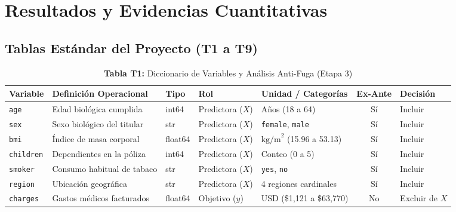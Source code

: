 \documentclass[11pt,a4paper]{article}
\begin{document}
\newpage
\section{Resultados y Evidencias Cuantitativas}

\subsection{Tablas Estándar del Proyecto (T1 a T9)}

\begin{table}[H]
\centering
\caption{\textbf{Tabla T1:} Diccionario de Variables y Análisis Anti-Fuga (Etapa 3)}
\footnotesize
\begin{tabularx}{\textwidth}{l p{3.2cm} l l l c l}
\toprule
\textbf{Variable} & \textbf{Definición Operacional} & \textbf{Tipo} & \textbf{Rol} & \textbf{Unidad / Categorías} & \textbf{Ex-Ante} & \textbf{Decisión} \\
\midrule
\texttt{age} & Edad biológica cumplida & int64 & Predictora ($X$) & Años (18 a 64) & Sí & Incluir \\
\texttt{sex} & Sexo biológico del titular & str & Predictora ($X$) & \texttt{female}, \texttt{male} & Sí & Incluir \\
\texttt{bmi} & Índice de masa corporal & float64 & Predictora ($X$) & $\text{kg/m}^2$ (15.96 a 53.13) & Sí & Incluir \\
\texttt{children} & Dependientes en la póliza & int64 & Predictora ($X$) & Conteo (0 a 5) & Sí & Incluir \\
\texttt{smoker} & Consumo habitual de tabaco & str & Predictora ($X$) & \texttt{yes}, \texttt{no} & Sí & Incluir \\
\texttt{region} & Ubicación geográfica & str & Predictora ($X$) & 4 regiones cardinales & Sí & Incluir \\
\texttt{charges} & Gastos médicos facturados & float64 & Objetivo ($y$) & USD (\$1,121 a \$63,770) & No & Excluir de $X$ \\
\bottomrule
\end{tabularx}
\end{table}
\end{document}
